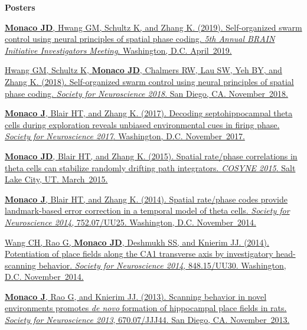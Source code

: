 \documentclass[10pt]{article}
\begin{document}
\begin{description}
\item \textbf{Posters}

\item[\quad] \href{http://www.cvent.com/events/5th-annual-brain-initiative-investigators-meeting/event-summary-de9c0d8f934b46eb8d80b55bcfbfe96a.aspx}{\textbf{Monaco JD}, Hwang GM, Schultz K, and Zhang K. (2019). Self-organized swarm control using neural principles of spatial phase coding. \emph{5th Annual BRAIN Initiative Investigators Meeting}. Washington, D.C. April~2019.}
\item[\quad] \href{https://abstractsonline.com/pp8/#!/4649/presentation/10884}{Hwang GM, Schultz K, \textbf{Monaco JD}, Chalmers RW, Lau SW, Yeh BY, and Zhang K. (2018). Self-organized swarm control using neural principles of spatial phase coding. \emph{Society for Neuroscience 2018}. San Diego, CA. November~2018.}
\item[\quad] \href{http://www.abstractsonline.com/pp8/#!/4376/presentation/6085}{\textbf{Monaco J}, Blair HT, and Zhang K. (2017). Decoding septohippocampal theta cells during exploration reveals unbiased environmental cues in firing phase. \emph{Society for Neuroscience 2017}. Washington, D.C. November~2017.}
\item[\quad] \href{http://jdmonaco.com/files/monaco-paper-cosyne15.pdf}{\textbf{Monaco JD}, Blair HT, and Zhang K. (2015). Spatial rate/phase correlations in theta cells can stabilize randomly drifting path integrators. \emph{COSYNE 2015}. Salt Lake City, UT. March~2015.}
\item[\quad] \href{http://www.abstractsonline.com/Plan/ViewAbstract.aspx?sKey=973d2662-ba7a-4ad2-aff9-fe0d4b77c262&cKey=9917ffaf-9e31-4213-acb9-4aab498ab4cd&mKey=54c85d94-6d69-4b09-afaa-502c0e680ca7}{\textbf{Monaco J}, Blair HT, and Zhang K. (2014). Spatial rate/phase codes provide landmark-based error correction in a temporal model of theta cells. \emph{Society for Neuroscience 2014}, 752.07/UU25. Washington, D.C. November~2014.}
\item[\quad] \href{http://www.abstractsonline.com/Plan/ViewAbstract.aspx?sKey=bfb59866-8deb-44a6-9515-a7aab630507b&cKey=d201b3aa-7725-452e-b0dd-c41d204b5b54&mKey=54c85d94-6d69-4b09-afaa-502c0e680ca7}{Wang CH, Rao G, \textbf{Monaco JD}, Deshmukh SS, and Knierim JJ. (2014). Potentiation of place fields along the CA1 transverse axis by investigatory head-scanning behavior. \emph{Society for Neuroscience 2014}, 848.15/UU30. Washington, D.C. November~2014.}
\item[\quad] \href{http://www.abstractsonline.com/Plan/ViewAbstract.aspx?sKey=32eccac1-4e1d-4e81-bf5c-f39bcb605757&cKey=4710dece-cc8e-4b48-8764-49ea174b91ef&mKey=8d2a5bec-4825-4cd6-9439-b42bb151d1cf}{\textbf{Monaco J}, Rao G, and Knierim JJ. (2013). Scanning behavior in novel environments promotes \emph{de novo} formation of hippocampal place fields in rats. \emph{Society for Neuroscience 2013}, 670.07/JJJ44. San Diego, CA. November~2013.}

\end{description}
\end{document}
